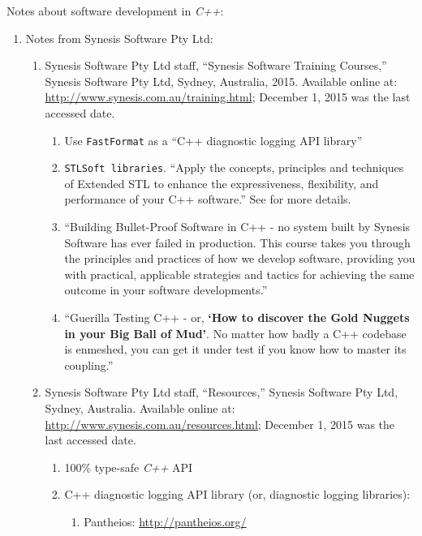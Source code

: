 Notes about software development in {\it C++}: \vspace{-0.3cm}
\begin{enumerate} \itemsep -4pt
\item Notes from Synesis Software Pty Ltd: \vspace{-0.3cm}
	\begin{enumerate} \itemsep -2pt
	\item Synesis Software Pty Ltd staff, ``Synesis Software Training Courses,'' Synesis Software Pty Ltd, Sydney, Australia, 2015.  Available online at: \url{http://www.synesis.com.au/training.html}; December 1, 2015 was the last accessed date. \vspace{-0.2cm}
		\begin{enumerate} \itemsep -2pt
		\item Use {\tt FastFormat} as a ``C++ diagnostic logging API library''
		\item {\tt STLSoft libraries}. ``Apply the concepts, principles and techniques of Extended STL to enhance the expressiveness, flexibility, and performance of your C++ software.'' See \cite{Wilson2007} for more details.
		\item ``Building Bullet-Proof Software in C++ - no system built by Synesis Software has ever failed in production. This course takes you through the principles and practices of how we develop software, providing you with practical, applicable strategies and tactics for achieving the same outcome in your software developments.''
		\item ``Guerilla Testing C++ - or, {\bf \large `How to discover the Gold Nuggets in your Big Ball of Mud'}. No matter how badly a C++ codebase is enmeshed, you can get it under test if you know how to master its coupling.''
		\end{enumerate}
	\item Synesis Software Pty Ltd staff, ``Resources,'' Synesis Software Pty Ltd, Sydney, Australia.  Available online at: \url{http://www.synesis.com.au/resources.html}; December 1, 2015 was the last accessed date. \vspace{-0.2cm}
		\begin{enumerate} \itemsep -2pt
		\item 100\% type-safe {\it C++} API
		\item C++ diagnostic logging API library (or, diagnostic logging libraries): \vspace{-0.1cm}
			\begin{enumerate} \itemsep -1pt
			\item Pantheios: \url{http://pantheios.org/}

\end{enumerate}
\end{enumerate}
\end{enumerate}
\end{enumerate}

